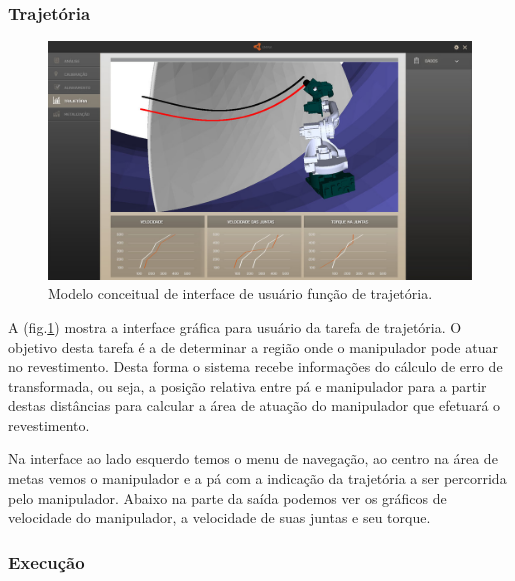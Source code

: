\documentclass[12pt,a4paper]{article}
\begin{document}
\subsubsection {Trajetória}

\begin{figure}[H]
\begin{center}
  \includegraphics[width=\columnwidth]{figs/Trajetoria.jpg}
  \caption{Modelo conceitual de interface de usuário função de trajetória.}
  \label{fig:Interface_trajetoria}
\end{center}
\end{figure} 

A (fig.\ref{fig:Interface_trajetoria}) mostra a interface gráfica para usuário
da tarefa de trajetória. O objetivo desta tarefa é a de determinar a região onde
o manipulador pode atuar no revestimento. Desta forma o sistema recebe
informações do cálculo de erro de transformada, ou seja, a posição relativa
entre pá e manipulador para a partir destas distâncias para calcular a área de
atuação do manipulador que efetuará o revestimento.

Na interface ao lado esquerdo temos o menu de navegação, ao centro na área de
metas vemos o manipulador e a pá com a indicação da trajetória a ser percorrida
pelo manipulador. Abaixo na parte da saída podemos ver os gráficos de
velocidade do manipulador, a velocidade de suas juntas e seu torque. 

\subsubsection {Execução}
\end{document}
